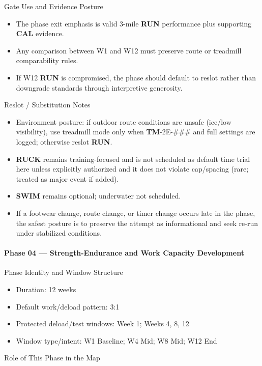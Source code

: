 \documentclass[10pt]{article}
\begin{document}
Gate Use and Evidence Posture

\begin{itemize}
\item The phase exit emphasis is valid 3-mile \textbf{RUN} performance plus supporting \textbf{CAL} evidence.
\item Any comparison between W1 and W12 must preserve route or treadmill comparability rules.
\item If W12 \textbf{RUN} is compromised, the phase should default to reslot rather than downgrade standards through interpretive generosity.
\end{itemize}

Reslot / Substitution Notes

\begin{itemize}
\item Environment posture: if outdoor route conditions are unsafe (ice/low visibility), use treadmill mode only when \textbf{TM}-2E-### and full settings are logged; otherwise reslot \textbf{RUN}.
\item \textbf{RUCK} remains training-focused and is not scheduled as default time trial here unless explicitly authorized and it does not violate cap/spacing (rare; treated as major event if added).
\item \textbf{SWIM} remains optional; underwater not scheduled.
\item If a footwear change, route change, or timer change occurs late in the phase, the safest posture is to preserve the attempt as informational and seek re-run under stabilized conditions.
\end{itemize}

\newpage
\paragraph*{Phase 04 — Strength-Endurance and Work Capacity Development}

Phase Identity and Window Structure

\begin{itemize}
\item Duration: 12 weeks
\item Default work/deload pattern: 3:1
\item Protected deload/test windows: Week 1; Weeks 4, 8, 12
\item Window type/intent: W1 Baseline; W4 Mid; W8 Mid; W12 End
\end{itemize}

Role of This Phase in the Map
\end{document}
